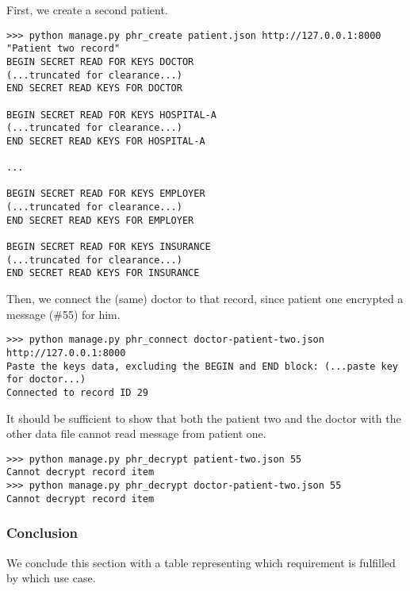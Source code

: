 \documentclass[a4paper]{article}
\begin{document}
			First, we create a second patient.
			
			\begin{lstlisting}
>>> python manage.py phr_create patient.json http://127.0.0.1:8000 "Patient two record"
BEGIN SECRET READ FOR KEYS DOCTOR
(...truncated for clearance...)
END SECRET READ KEYS FOR DOCTOR

BEGIN SECRET READ FOR KEYS HOSPITAL-A
(...truncated for clearance...)
END SECRET READ KEYS FOR HOSPITAL-A

...

BEGIN SECRET READ FOR KEYS EMPLOYER
(...truncated for clearance...)
END SECRET READ KEYS FOR EMPLOYER

BEGIN SECRET READ FOR KEYS INSURANCE
(...truncated for clearance...)
END SECRET READ KEYS FOR INSURANCE
			\end{lstlisting}
			
			Then, we connect the (same) doctor to that record, since patient one encrypted a message (\#55) for him.
			
			\begin{lstlisting}
>>> python manage.py phr_connect doctor-patient-two.json http://127.0.0.1:8000
Paste the keys data, excluding the BEGIN and END block: (...paste key for doctor...)
Connected to record ID 29
			\end{lstlisting}
			
			It should be sufficient to show that both the patient two and the doctor with the other data file cannot read message from patient one.
			
			\begin{lstlisting}
>>> python manage.py phr_decrypt patient-two.json 55
Cannot decrypt record item
>>> python manage.py phr_decrypt doctor-patient-two.json 55
Cannot decrypt record item
			\end{lstlisting}
		
		\subsubsection{Conclusion}
			We conclude this section with a table representing which requirement is fulfilled by which use case.
\end{document}
